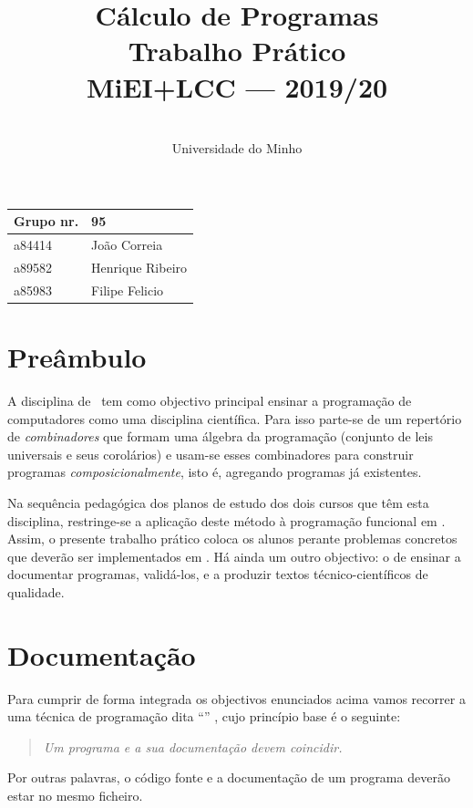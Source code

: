 \documentclass[a4paper]{article}
\title{
             Cálculo de Programas
\\
         Trabalho Prático
\\
         MiEI+LCC --- 2019/20
}
\author{
         \dium
\\
         Universidade do Minho
}
\date\mydate
\begin{document}
\maketitle

\begin{center}\large
\begin{tabular}{ll}
\textbf{Grupo} nr. & 95
\\\hline
a84414 & João Correia
\\
a89582 & Henrique Ribeiro
\\
a85983 & Filipe Felicio 
\end{tabular}
\end{center}

\section{Preâmbulo}

A disciplina de \CP\ tem como objectivo principal ensinar
a progra\-mação de computadores como uma disciplina científica. Para isso
parte-se de um repertório de \emph{combinadores} que formam uma álgebra da
programação (conjunto de leis universais e seus corolários) e usam-se esses
combinadores para construir programas \emph{composicionalmente}, isto é,
agregando programas já existentes.
  
Na sequência pedagógica dos planos de estudo dos dois cursos que têm
esta disciplina, restringe-se a aplicação deste método à programação
funcional em \Haskell. Assim, o presente trabalho prático coloca os
alunos perante problemas concretos que deverão ser implementados em
\Haskell.  Há ainda um outro objectivo: o de ensinar a documentar
programas, validá-los, e a produzir textos técnico-científicos de
qualidade.

\section{Documentação} Para cumprir de forma integrada os objectivos
enunciados acima vamos recorrer a uma técnica de programa\-ção dita
``'' \cite{Kn92}, cujo princípio base é o seguinte:
\begin{quote}\em Um programa e a sua documentação devem coincidir.
\end{quote} Por outras palavras, o código fonte e a documentação de um
programa deverão estar no mesmo ficheiro.
\end{document}
